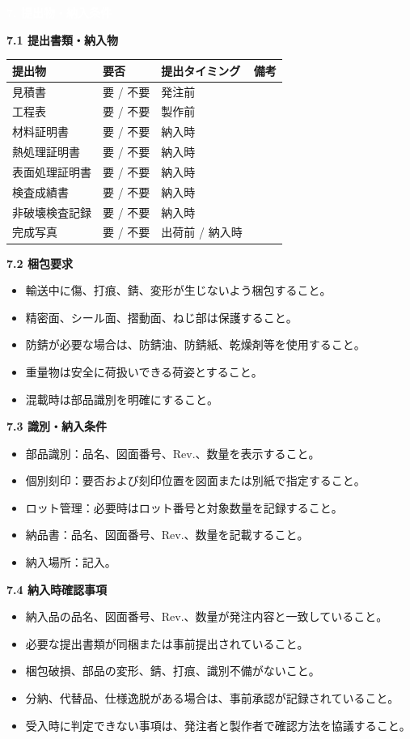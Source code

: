 \documentclass[a4paper,10pt]{ltjsarticle}
\makeatletter
\newlength{\SpecBodyWidth}
\newcommand{\PageTitle}[1]{%
  \vspace*{2mm}%
  \noindent\colorbox{SpecHead}{%
    \parbox{\dimexpr\SpecBodyWidth-2\fboxsep\relax}{%
      \large\bfseries\textcolor{white}{#1}%
    }%
  }%
  \par\vspace{5mm}%
}
\newcommand{\BlockTitle}[1]{%
  \vspace{4mm}%
  \noindent\colorbox{SpecSoft}{%
    \parbox{\dimexpr\SpecBodyWidth-2\fboxsep\relax}{%
      \normalsize\bfseries\textcolor{SpecHead}{#1}%
    }%
  }%
  \par\vspace{1.5mm}%
}
\newenvironment{SpecTable}[1]{%
  \par\vspace{1mm}%
  \noindent\footnotesize%
  \renewcommand{\arraystretch}{1.10}%
  \setlength{\tabcolsep}{3.0pt}%
  \begin{tabular*}{\SpecBodyWidth}{@{\extracolsep{\fill}}#1@{}}%
}{%
  \end{tabular*}%
  \par\vspace{1.5mm}%
}
\newcommand{\Head}[1]{\textbf{\textcolor{SpecHead}{#1}}}
\newcommand{\YN}{要 / 不要}
\makeatother
\begin{document}
\clearpage

\PageTitle{7. 提出物・納入条件}

\BlockTitle{7.1 提出書類・納入物}
\begin{SpecTable}{|p{48mm}|p{22mm}|p{34mm}|p{42mm}|}
\hline
\Head{提出物} & \Head{要否} & \Head{提出タイミング} & \Head{備考} \\
\hline
見積書 & \YN & 発注前 &  \\
\hline
工程表 & \YN & 製作前 &  \\
\hline
材料証明書 & \YN & 納入時 &  \\
\hline
熱処理証明書 & \YN & 納入時 &  \\
\hline
表面処理証明書 & \YN & 納入時 &  \\
\hline
検査成績書 & \YN & 納入時 &  \\
\hline
非破壊検査記録 & \YN & 納入時 &  \\
\hline
完成写真 & \YN & 出荷前 / 納入時 &  \\
\hline
\end{SpecTable}

\BlockTitle{7.2 梱包要求}
\begin{itemize}
  \item 輸送中に傷、打痕、錆、変形が生じないよう梱包すること。
  \item 精密面、シール面、摺動面、ねじ部は保護すること。
  \item 防錆が必要な場合は、防錆油、防錆紙、乾燥剤等を使用すること。
  \item 重量物は安全に荷扱いできる荷姿とすること。
  \item 混載時は部品識別を明確にすること。
\end{itemize}

\BlockTitle{7.3 識別・納入条件}
\begin{itemize}
  \item 部品識別：品名、図面番号、Rev.、数量を表示すること。
  \item 個別刻印：要否および刻印位置を図面または別紙で指定すること。
  \item ロット管理：必要時はロット番号と対象数量を記録すること。
  \item 納品書：品名、図面番号、Rev.、数量を記載すること。
  \item 納入場所：記入。
\end{itemize}

\BlockTitle{7.4 納入時確認事項}
\begin{itemize}
  \item 納入品の品名、図面番号、Rev.、数量が発注内容と一致していること。
  \item 必要な提出書類が同梱または事前提出されていること。
  \item 梱包破損、部品の変形、錆、打痕、識別不備がないこと。
  \item 分納、代替品、仕様逸脱がある場合は、事前承認が記録されていること。
  \item 受入時に判定できない事項は、発注者と製作者で確認方法を協議すること。
\end{itemize}
\end{document}
